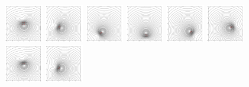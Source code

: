 \documentclass[12pt]{amsart}
\theoremstyle{remark}
\begin{document}
\begin{figure}[h!]
	\centering
	\includegraphics[width=0.15\textwidth]{./images/grouping_frames/order_0_time_0}
	\includegraphics[width=0.15\textwidth]{./images/grouping_frames/order_0_time_51}
	\includegraphics[width=0.15\textwidth]{./images/grouping_frames/order_0_time_101}
	\includegraphics[width=0.15\textwidth]{./images/grouping_frames/order_0_time_152}
	\includegraphics[width=0.15\textwidth]{./images/grouping_frames/order_0_time_202}
	\includegraphics[width=0.15\textwidth]{./images/grouping_frames/order_0_time_253}	
	\includegraphics[width=0.15\textwidth]{./images/grouping_frames/order_1_time_0}
	\includegraphics[width=0.15\textwidth]{./images/grouping_frames/order_1_time_51}

\end{figure}
\end{document}

